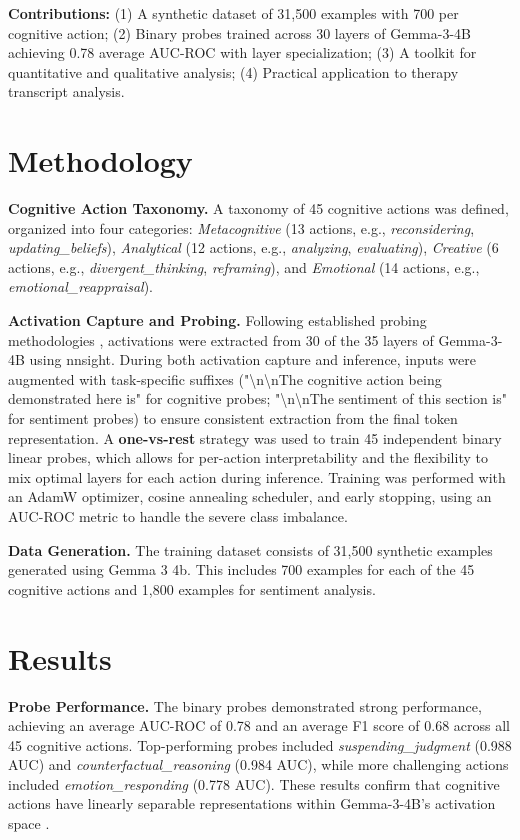 \documentclass[letterpaper]{article}
\begin{document}
\textbf{Contributions:} (1) A synthetic dataset of 31,500 examples with 700 per cognitive action; (2) Binary probes trained across 30 layers of Gemma-3-4B achieving 0.78 average AUC-ROC with layer specialization; (3) A toolkit for quantitative and qualitative analysis; (4) Practical application to therapy transcript analysis.

\section{Methodology}

\textbf{Cognitive Action Taxonomy.} A taxonomy of 45 cognitive actions was defined, organized into four categories: \textit{Metacognitive} (13 actions, e.g., \textit{reconsidering}, \textit{updating\_beliefs}), \textit{Analytical} (12 actions, e.g., \textit{analyzing}, \textit{evaluating}), \textit{Creative} (6 actions, e.g., \textit{divergent\_thinking}, \textit{reframing}), and \textit{Emotional} (14 actions, e.g., \textit{emotional\_reappraisal}).

\textbf{Activation Capture and Probing.} Following established probing methodologies \cite{alain2016understanding,chen2024designing}, activations were extracted from 30 of the 35 layers of Gemma-3-4B using nnsight. During both activation capture and inference, inputs were augmented with task-specific suffixes ("\textbackslash n\textbackslash nThe cognitive action being demonstrated here is" for cognitive probes; "\textbackslash n\textbackslash nThe sentiment of this section is" for sentiment probes) to ensure consistent extraction from the final token representation. A \textbf{one-vs-rest} strategy was used to train 45 independent binary linear probes, which allows for per-action interpretability and the flexibility to mix optimal layers for each action during inference. Training was performed with an AdamW optimizer, cosine annealing scheduler, and early stopping, using an AUC-ROC metric to handle the severe class imbalance.

\textbf{Data Generation.} The training dataset consists of 31,500 synthetic examples generated using Gemma 3 4b. This includes 700 examples for each of the 45 cognitive actions and 1,800 examples for sentiment analysis.

\section{Results}

\textbf{Probe Performance.} The binary probes demonstrated strong performance, achieving an average AUC-ROC of 0.78 and an average F1 score of 0.68 across all 45 cognitive actions. Top-performing probes included \textit{suspending\_judgment} (0.988 AUC) and \textit{counterfactual\_reasoning} (0.984 AUC), while more challenging actions included \textit{emotion\_responding} (0.778 AUC). These results confirm that cognitive actions have linearly separable representations within Gemma-3-4B's activation space \cite{alain2016understanding}.
\end{document}
